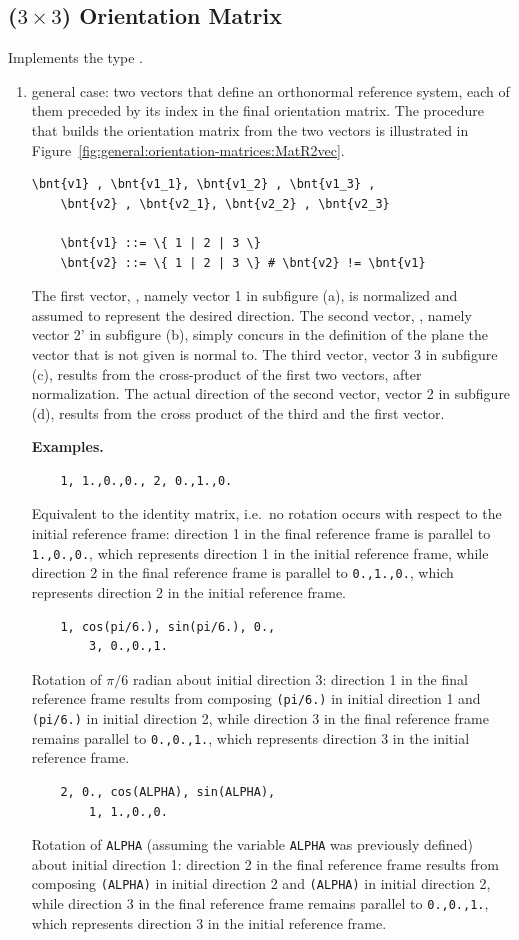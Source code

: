 \subsection{($3 \times 3$) Orientation Matrix}
\label{sec:OrientationMatrix}
Implements the type .
\begin{enumerate}
\item general case: two vectors that define an orthonormal reference
system, each of them preceded by its index in the final orientation matrix.
The procedure that builds the orientation matrix from the two vectors
is illustrated in Figure~\ref{fig:general:orientation-matrices:MatR2vec}.
\begin{Verbatim}[commandchars=\\\{\}]
    \bnt{v1} , \bnt{v1_1}, \bnt{v1_2} , \bnt{v1_3} ,
    \bnt{v2} , \bnt{v2_1}, \bnt{v2_2} , \bnt{v2_3}

    \bnt{v1} ::= \{ 1 | 2 | 3 \}
    \bnt{v2} ::= \{ 1 | 2 | 3 \} # \bnt{v2} != \bnt{v1}
\end{Verbatim}
The first vector, , namely vector 1 in subfigure (a), is normalized and assumed
to represent the desired direction.
The second vector, , namely vector 2' in subfigure (b), simply concurs
in the definition of the plane the vector that is not given is normal to.
The third vector, vector 3 in subfigure (c), results from the cross-product
of the first two vectors, after normalization.
The actual direction of the second vector, vector 2 in subfigure (d),
results from the cross product of the third and the first vector.

\noindent
\textbf{Examples.}
\begin{verbatim}
    1, 1.,0.,0., 2, 0.,1.,0.
\end{verbatim}
Equivalent to the identity matrix, i.e.\ no rotation 
occurs with respect to the initial reference frame: direction 1
in the final reference frame is parallel to \texttt{1.,0.,0.}, which represents
direction 1 in the initial reference frame, while direction 2 in the final reference frame
is parallel to \texttt{0.,1.,0.}, which represents direction 2
in the initial reference frame.
\begin{verbatim}
    1, cos(pi/6.), sin(pi/6.), 0.,
        3, 0.,0.,1.
\end{verbatim}
Rotation of $ \pi/6 $ radian about
initial direction 3: direction 1 in the final reference frame results from 
composing \texttt{(pi/6.)} in initial direction 1
and \texttt{(pi/6.)}
in initial direction 2, while direction 3 in the final reference frame remains
parallel to \texttt{0.,0.,1.}, which represents direction 3 in the initial reference frame.
\begin{verbatim}
    2, 0., cos(ALPHA), sin(ALPHA),
        1, 1.,0.,0.
\end{verbatim}
Rotation of \texttt{ALPHA} (assuming the variable \texttt{ALPHA} was previously defined) about
initial direction 1: direction 2 in the final reference frame results from 
composing \texttt{(ALPHA)} in initial direction 2
and \texttt{(ALPHA)}
in initial direction 2, while direction 3 in the final reference frame remains
parallel to \texttt{0.,0.,1.}, which represents direction 3 in the initial reference frame.


\end{enumerate}
